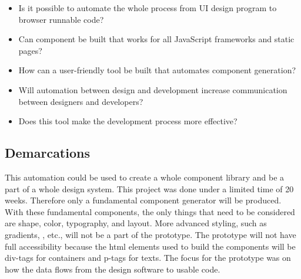 \begin{itemize}
  \item Is it possible to automate the whole process from UI design program to browser runnable code? 
  \item Can \gls{component} be built that works for all JavaScript frameworks and static pages? 
  \item How can a user-friendly tool be built that automates component generation? 
  \item Will automation between design and development increase communication between designers and developers? 
  \item Does this tool make the development process more effective?
\end{itemize}

\subsection{Demarcations}%
\label{sub:Demarcations}
This automation could be used to create a whole component library and be a part of a whole design system. This project was done under a limited time of 20 weeks. Therefore only a fundamental component generator will be produced. With these fundamental \glspl{component}, the only things that need to be considered are shape, color, typography, and layout. More advanced styling, such as gradients, , etc., will not be a part of the prototype. The prototype will not have full accessibility because the \acrshort{html} elements used to build the \glspl{component} will be \glspl{div-tag} for containers and \glspl{p-tag} for texts. The focus for the prototype was on how the data flows from the design software to usable code.




